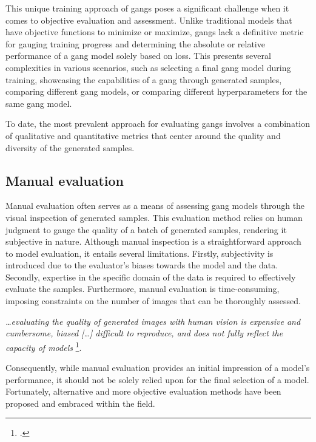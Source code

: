 This unique training approach of \gls{gang}s poses a significant challenge when it comes to objective evaluation and assessment. 
Unlike traditional models that have objective functions to minimize or maximize, \gls{gang}s lack a definitive metric for gauging training progress and determining the absolute or relative performance of a \gls{gang} model solely based on loss. 
This presents several complexities in various scenarios, such as selecting a final \gls{gang} model during training, showcasing the capabilities of a \gls{gang} through generated samples, comparing different \gls{gang} models, or comparing different hyperparameters for the same \gls{gang} model.

To date, the most prevalent approach for evaluating \gls{gang}s involves a combination of qualitative and quantitative metrics that center around the quality and diversity of the generated samples.
\subsection{Manual evaluation}
\label{subsec:manual-evaluation}
Manual evaluation often serves as a means of assessing \gls{gang} models through the visual inspection of generated samples. 
This evaluation method relies on human judgment to gauge the quality of a batch of generated samples, rendering it subjective in nature. 
Although manual inspection is a straightforward approach to model evaluation, it entails several limitations. 
Firstly, subjectivity is introduced due to the evaluator's biases towards the model and the data. Secondly, expertise in the specific domain of the data is required to effectively evaluate the samples. 
Furthermore, manual evaluation is time-consuming, imposing constraints on the number of images that can be thoroughly assessed.

\emph{…evaluating the quality of generated images with human vision is expensive and cumbersome, biased […] difficult to reproduce, and does not fully reflect the capacity of models}
\footcite{paper:ganeval}.

Consequently, while manual evaluation provides an initial impression of a model's performance, it should not be solely relied upon for the final selection of a model. Fortunately, alternative and more objective evaluation methods have been proposed and embraced within the field.
